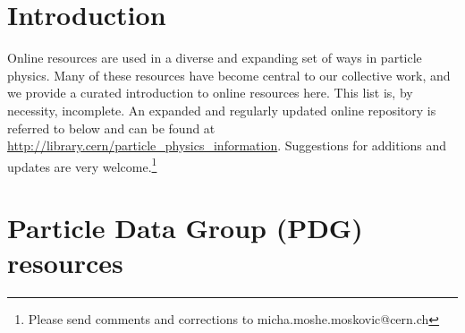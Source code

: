 \section{Introduction}\label{databases:sec:introduction}
Online resources are used in a diverse and expanding set of ways in particle physics. 
Many of these resources have become central to our collective work, and we provide a curated
introduction to online resources here. This list is, by necessity, incomplete. An expanded and regularly
updated online repository is referred to below and can be found at \url{http://library.cern/particle_physics_information}. 
Suggestions for additions and updates are very welcome.\footnote{Please
  send comments and corrections to micha.moshe.moskovic@cern.ch}

\section{Particle Data Group (PDG)
resources}\label{databases:sec:resources}

